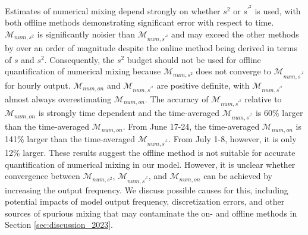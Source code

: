 Estimates of numerical mixing depend strongly on whether $s^2$ or $s^{\prime^2}$ is used, with both offline methods demonstrating significant error with respect to time. $\mathcal{M}_{num, s^2}$ is significantly noisier than $\mathcal{M}_{num, s^{\prime^2}}$ and may exceed the other methods by over an order of magnitude despite the online method being derived in terms of $s$ and $s^2$. Consequently, the $s^2$ budget should not be used for offline quantification of numerical mixing because $\mathcal{M}_{num, s^2}$ does not converge to $\mathcal{M}_{num, s^{\prime^2}}$ for hourly output. $\mathcal{M}_{num, on}$ and $\mathcal{M}_{num, s^{\prime^2}}$ are positive definite, with $\mathcal{M}_{num, s^{\prime^2}}$ almost always overestimating $\mathcal{M}_{num, on}$. The accuracy of $\mathcal{M}_{num, s^{\prime^2}}$ relative to $\mathcal{M}_{num, on}$ is strongly time dependent and the time-averaged $\mathcal{M}_{num, s^{\prime^2}}$ is 60\% larger than the time-averaged $\mathcal{M}_{num, on}$. From June 17-24, the time-averaged $\mathcal{M}_{num, on}$ is 141\% larger than the time-averaged $\mathcal{M}_{num, s^{\prime^2}}$. From July 1-8, however, it is only 12\% larger. These results suggest the offline method is not suitable for accurate quantification of numerical mixing in our model. However, it is unclear whether convergence between $\mathcal{M}_{num, s^2}$, $\mathcal{M}_{num, s^{\prime^2}}$, and $\mathcal{M}_{num,on}$ can be achieved by increasing the output frequency. We discuss possible causes for this, including potential impacts of model output frequency, discretization errors, and other sources of spurious mixing that may contaminate the on- and offline methods in Section \ref{sec:discussion_2023}.  


